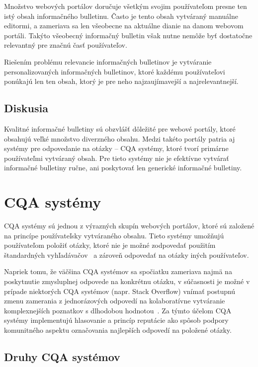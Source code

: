 Množstvo webových portálov doručuje všetkým svojim používateľom presne ten istý obsah informačného bulletinu.
Často je tento obsah vytváraný manuálne editormi, a zameriava sa len všeobecne na aktuálne dianie na danom webovom
portáli. Takýto všeobecný informačný bulletin však nutne nemôže byť dostatočne relevantný pre značnú časť používateľov.

Riešením problému relevancie informačných bulletinov je vytváranie personalizovaných informačných bulletinov, ktoré
každému používateľovi ponúkajú len ten obsah, ktorý je pre neho najzaujímavejší a najrelevantnejší.


\section{Diskusia}

Kvalitné informačné bulletiny sú obzvlášť dôležité pre webové portály, ktoré obsahujú veľké množstvo diverzného obsahu.
Medzi takéto portály patria aj systémy pre odpovedanie na otázky -- CQA systémy, ktoré tvorí primárne používateľmi
vytváraný obsah. Pre tieto systémy nie je efektívne vytvárať informačné bulletiny ručne, ani poskytovať len generické
informačné bulletiny.




\newpage
\chapter{CQA systémy}

CQA systémy sú jednou z výrazných skupín webových portálov, ktoré sú založené na princípe používateľsky vytváraného obsahu.
Tieto systémy umožňujú používateľom položiť otázky, ktoré nie je možné zodpovedať použitím štandardných vyhľadávačov~\cite{Liu2012}
a zároveň odpovedať na otázky iných používateľov.

Napriek tomu, že väčšina CQA systémov sa spočiatku zameriava najmä na poskytnutie zmysluplnej odpovede na konkrétnu otázku,
v súčasnosti je možné v prípade niektorých CQA systémov (napr. Stack Overflow) vnímať postupnú zmenu zamerania
z jednorázových odpovedí na kolaboratívne vytváranie komplexnejších poznatkov s dlhodobou hodnotou~\cite{Anderson2012}.
Za týmto účelom CQA systémy implementujú hlasovanie a princíp reputácie ako spôsob podpory komunitného aspektu označovania
najlepších odpovedí na položené otázky.


\section{Druhy CQA systémov}

